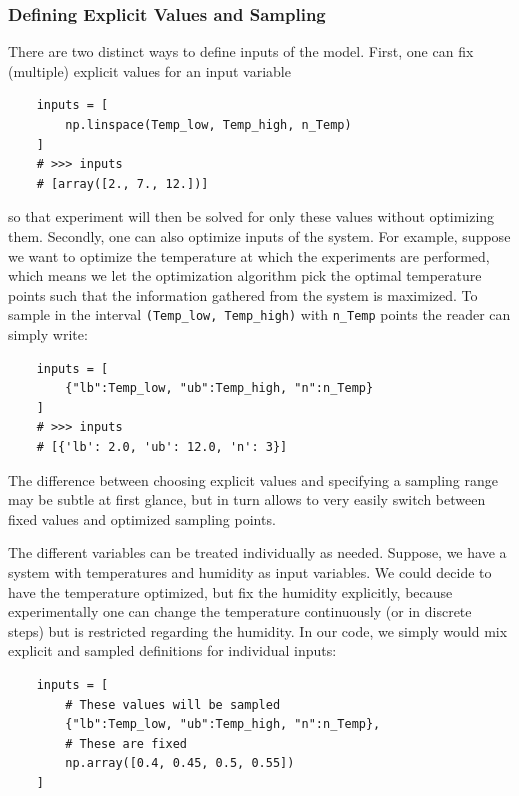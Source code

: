 \documentclass[graybox]{svmult}
\begin{document}
\subsubsection*{Defining Explicit Values and Sampling}
There are two distinct ways to define inputs of the model.
First, one can fix (multiple) explicit values for an input variable
\begin{verbatim}
    inputs = [
        np.linspace(Temp_low, Temp_high, n_Temp)
    ]
    # >>> inputs
    # [array([2., 7., 12.])]
\end{verbatim}
so that experiment will then be solved for only these values without optimizing them.
Secondly, one can also optimize inputs of the system.
For example, suppose we want to optimize the temperature at which the experiments are performed, which means we let the optimization algorithm pick the optimal temperature points such that the information gathered from the system is maximized.
To sample in the interval \texttt{(Temp_low, Temp_high)} with \texttt{n_Temp} points the reader can simply write:
\begin{verbatim}
    inputs = [
        {"lb":Temp_low, "ub":Temp_high, "n":n_Temp}
    ]
    # >>> inputs
    # [{'lb': 2.0, 'ub': 12.0, 'n': 3}]
\end{verbatim}
The difference between choosing explicit values and specifying a sampling range may be subtle at first glance, but in turn allows to very easily switch between fixed values and optimized sampling points.

The different variables can be treated individually as needed.
Suppose, we have a system with temperatures and humidity as input variables.
We could decide to have the temperature optimized, but fix the humidity explicitly, because experimentally one can change the temperature continuously (or in discrete steps) but is restricted regarding the humidity.
In our code, we simply would mix explicit and sampled definitions for individual inputs:
\begin{verbatim}
    inputs = [
        # These values will be sampled
        {"lb":Temp_low, "ub":Temp_high, "n":n_Temp},
        # These are fixed
        np.array([0.4, 0.45, 0.5, 0.55])
    ]
\end{verbatim}
%
\end{document}
